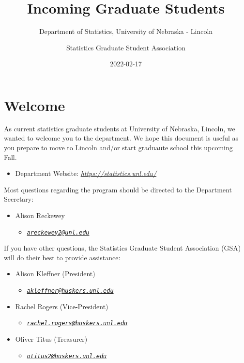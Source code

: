 \documentclass[
  12pt,
]{book}
\title{Incoming Graduate Students}
\subtitle{Department of Statistics, University of Nebraska - Lincoln}
\author{Statistics Graduate Student Association}
\date{2022-02-17}
\providecommand{\tightlist}{%
  \setlength{\itemsep}{0pt}\setlength{\parskip}{0pt}}
\begin{document}
\maketitle

{
\setcounter{tocdepth}{1}
\tableofcontents
}
\hypertarget{welcome}{%
\chapter{Welcome}\label{welcome}}

As current statistics graduate students at University of Nebraska, Lincoln, we wanted to welcome you to the department. We hope this document is useful as you prepare to move to Lincoln and/or start graduaute school this upcoming Fall.

\begin{itemize}
\tightlist
\item
  Department Website: \emph{\url{https://statistics.unl.edu/}}
\end{itemize}

Most questions regarding the program should be directed to the Department Secretary:

\begin{itemize}
\tightlist
\item
  Alison Reckewey

  \begin{itemize}
  \tightlist
  \item
    \emph{\href{mailto:areckewey2@unl.edu}{\nolinkurl{areckewey2@unl.edu}}}
  \end{itemize}
\end{itemize}

If you have other questions, the Statistics Graduate Student Association (GSA) will do their best to provide assistance:

\begin{itemize}
\tightlist
\item
  Alison Kleffner (President)

  \begin{itemize}
  \tightlist
  \item
    \emph{\href{mailto:akleffner@huskers.unl.edu}{\nolinkurl{akleffner@huskers.unl.edu}}}
  \end{itemize}
\item
  Rachel Rogers (Vice-President)

  \begin{itemize}
  \tightlist
  \item
    \emph{\href{mailto:rachel.rogers@huskers.unl.edu}{\nolinkurl{rachel.rogers@huskers.unl.edu}}}
  \end{itemize}
\item
  Oliver Titus (Treasurer)

  \begin{itemize}
  \tightlist
  \item
    \emph{\href{mailto:otitus2@huskers.unl.edu}{\nolinkurl{otitus2@huskers.unl.edu}}}
  \end{itemize}
\end{itemize}
\end{document}
